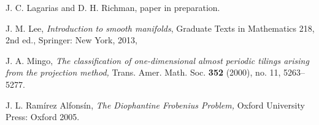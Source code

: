 \documentclass[11pt, letterpaper, reqno]{amsart}
\theoremstyle{definition}
\theoremstyle{remark}
\numberwithin{equation}{section}
\begin{document}
\begin{thebibliography}{99}
 J. C. Lagarias and D. H. Richman,
 paper in preparation.

 
     J. M. Lee, 
    \emph{Introduction to smooth manifolds},
    {Graduate Texts in Mathematics}
    {218},
   {2nd ed.},
      {Springer: New York},
      {2013},

J. A. Mingo,
\emph{The classification of one-dimensional almost periodic tilings arising from
the projection method,}
Trans. Amer. Math. Soc. {\bf 352} (2000), no. 11, 5263--5277.

 
 
 
 J. L. Ram\'{i}rez Alfons\'{i}n,
 \emph{The Diophantine Frobenius Problem,}
 Oxford University Press: Oxford 2005.
 
 
 




\end{thebibliography}
\end{document}
